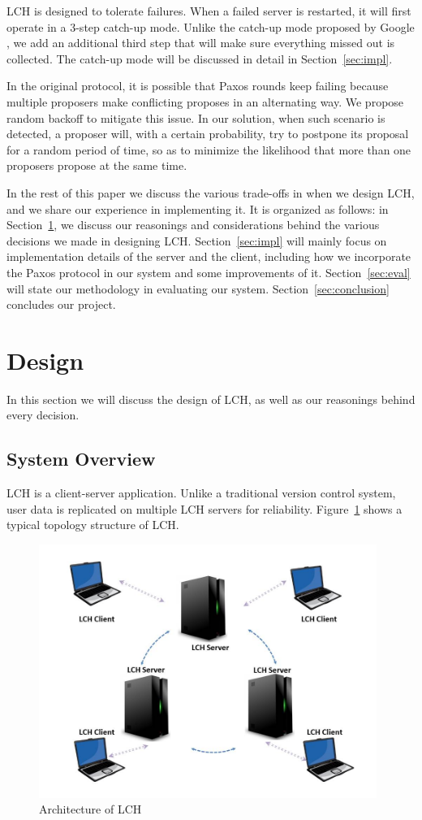 \documentclass[11pt]{article}
\begin{document}
LCH is designed to tolerate failures.
When a failed server is restarted, it will first operate in a 3-step catch-up mode.
Unlike the catch-up mode proposed by Google \cite{paxos2}, we add an additional third step that will make sure everything missed out is collected.
The catch-up mode will be discussed in detail in Section~\ref{sec:impl}.

In the original protocol, it is possible that Paxos rounds keep failing because multiple proposers make conflicting proposes in an alternating way.
We propose random backoff to mitigate this issue.
In our solution, when such scenario is detected, a proposer will, with a certain probability, try to postpone its proposal for a random period of time, so as to minimize the likelihood that more than one proposers propose at the same time.

In the rest of this paper we discuss the various trade-offs in when we design LCH, and we share our experience in implementing it.
It is organized as follows: in Section~\ref{sec:design}, we discuss our reasonings and considerations behind the various decisions we made in designing LCH.
Section~\ref{sec:impl} will mainly focus on implementation details of the server and the client, including how we incorporate the Paxos protocol in our system and some improvements of it.
Section~\ref{sec:eval} will state our methodology in evaluating our system.
Section~\ref{sec:conclusion} concludes our project.


\section{Design}
\label{sec:design}
In this section we will discuss the design of LCH, as well as our reasonings behind every decision.

\subsection{System Overview}
LCH is a client-server application.
Unlike a traditional version control system, user data is replicated on multiple LCH servers for reliability.
Figure~\ref{fig:1} shows a typical topology structure of LCH.

\begin{figure}[ht!]
\centering
\includegraphics[width=110mm]{architecture.jpg}
\caption{Architecture of LCH}
    \label{fig:1}
\end{figure}
\end{document}
